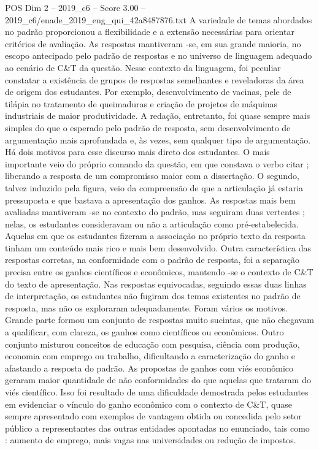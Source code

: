 \begin{textsample}{POS Dim 2 – 2019\_c6 – Score 3.00 – 2019\_c6/enade\_2019\_eng\_qui\_42a8487876.txt}
A variedade de temas abordados no padrão proporcionou a flexibilidade e a extensão necessárias para orientar critérios de avaliação.
As respostas mantiveram -se, em sua grande maioria, no escopo antecipado pelo padrão de respostas e no universo de linguagem adequado ao cenário de C\&T da questão.
Nesse contexto da linguagem, foi peculiar constatar a existência de grupos de respostas semelhantes e reveladoras da área de origem dos estudantes.
Por exemplo, desenvolvimento de vacinas, pele de tilápia no tratamento de queimaduras e criação de projetos de máquinas industriais de maior produtividade.
A redação, entretanto, foi quase sempre mais simples do que o esperado pelo padrão de resposta, sem desenvolvimento de argumentação mais aprofundada e, às vezes, sem qualquer tipo de argumentação.
Há dois motivos para esse discurso mais direto dos estudantes.
O mais importante veio do próprio comando da questão, em que constava o verbo citar ; liberando a resposta de um compromisso maior com a dissertação.
O segundo, talvez induzido pela figura, veio da compreensão de que a articulação já estaria pressuposta e que bastava a apresentação dos ganhos.
As respostas mais bem avaliadas mantiveram -se no contexto do padrão, mas seguiram duas vertentes ; nelas, os estudantes consideravam ou não a articulação como pré-estabelecida.
Aquelas em que os estudantes fizeram a associação no próprio texto da resposta tinham um conteúdo mais rico e mais bem desenvolvido.
Outra característica das respostas corretas, na conformidade com o padrão de resposta, foi a separação precisa entre os ganhos científicos e econômicos, mantendo -se o contexto de C\&T do texto de apresentação.
Nas respostas equivocadas, seguindo essas duas linhas de interpretação, os estudantes não fugiram dos temas existentes no padrão de resposta, mas não os exploraram adequadamente.
Foram vários os motivos.
Grande parte formou um conjunto de respostas muito sucintas, que não chegavam a qualificar, com clareza, os ganhos como científicos ou econômicos.
Outro conjunto misturou conceitos de educação com pesquisa, ciência com produção, economia com emprego ou trabalho, dificultando a caracterização do ganho e afastando a resposta do padrão.
As propostas de ganhos com viés econômico geraram maior quantidade de não conformidades do que aquelas que trataram do viés científico.
Isso foi resultado de uma dificuldade demostrada pelos estudantes em evidenciar o vínculo do ganho econômico com o contexto de C\&T, quase sempre apresentado com exemplos de vantagem obtida ou concedida pelo setor público a representantes das outras entidades apontadas no enunciado, tais como : aumento de emprego, mais vagas nas universidades ou redução de impostos.

\end{textsample}
